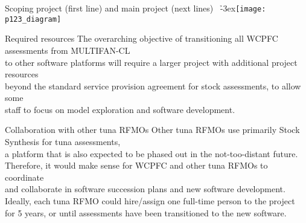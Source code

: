 \documentclass[aspectratio=169,fleqn]{beamer}
\begin{document}

\begin{frame}{Scoping project (first line) and main project (next lines)}
  \vspace{1ex}
  ~\h{-3ex}\texttt{[image: p123\_diagram]}
\end{frame}


\begin{frame}{Required resources}
  The overarching objective of transitioning all WCPFC assessments from
  MULTIFAN-CL\\[0.5ex]
  to other software platforms will require a larger project with
  additional project resources\\[0.5ex]
  beyond the standard service provision agreement for stock assessments, to
  allow some\\[0.5ex]
  staff to focus on model exploration and software development.
\end{frame}


\begin{frame}{Collaboration with other tuna RFMOs}
  Other tuna RFMOs use primarily Stock Synthesis for tuna assessments,\\[0.5ex]
  a platform that is also expected to be phased out in the not-too-distant
  future.\\[0.5ex]
  Therefore, it would make sense for WCPFC and other tuna RFMOs to
  coordinate\\[0.5ex]
  and collaborate in software succession plans and new software
  development.\\[5ex]
  Ideally, each tuna RFMO could hire/assign one full-time person to the
  project\\[0.5ex]
  for 5 years, or until assessments have been transitioned to the new
  software.\\[4ex]
\end{frame}

\end{document}

